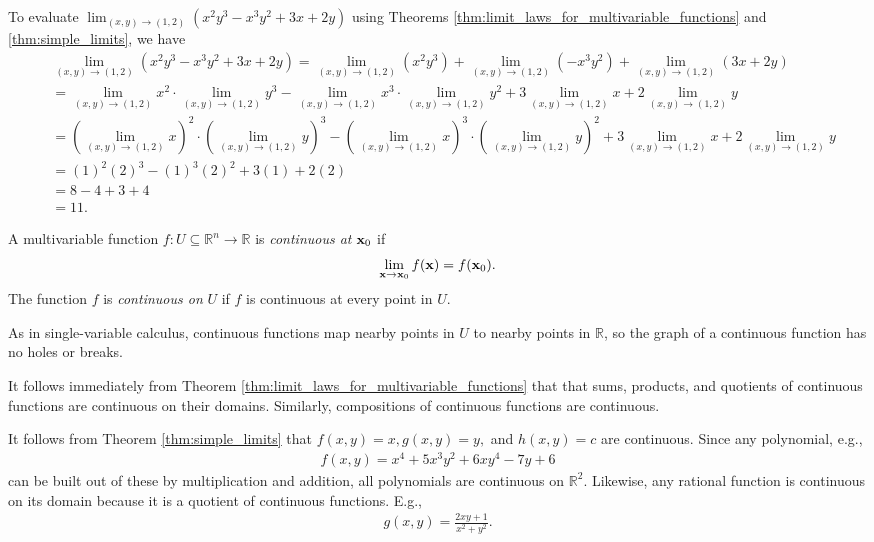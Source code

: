 \documentclass[12pt,letterpaper,reqno]{article}
\numberwithin{equation}{section}
\newcommand{\R}{\ensuremath{\mathbb R}}
\newcommand{\bx}{{\bf x}}
\begin{document}
{\begin{example}
To evaluate $\lim_{(x,y) \to (1,2)}(x^2y^3-x^3y^2+3x+2y)$ using Theorems \ref{thm:limit_laws_for_multivariable_functions} and \ref{thm:simple_limits}, we have
\begin{align*}
	&\lim_{(x,y) \to (1,2)}(x^2y^3-x^3y^2+3x+2y)=\lim_{(x,y) \to (1,2)}(x^2y^3)+\lim_{(x,y) \to (1,2)}(-x^3y^2)+\lim_{(x,y) \to (1,2)}(3x+2y) \\
	&=\lim_{(x,y) \to (1,2)}x^2\cdot \lim_{(x,y) \to (1,2)}y^3 - \lim_{(x,y) \to (1,2)} x^3\cdot \lim_{(x,y) \to (1,2)} y^2+3\lim_{(x,y) \to (1,2)} x+2\lim_{(x,y) \to (1,2)}y \\
	&=(\lim_{(x,y) \to (1,2)}x)^2\cdot (\lim_{(x,y) \to (1,2)}y)^3 - (\lim_{(x,y) \to (1,2)} x)^3\cdot (\lim_{(x,y) \to (1,2)} y)^2+3\lim_{(x,y) \to (1,2)} x+2\lim_{(x,y) \to (1,2)}y \\ 
	&=(1)^2(2)^3-(1)^3(2)^2+3(1)+2(2) \\
	&=8-4+3+4 \\
	&=11.
\end{align*} 	
\end{example}

\begin{defn}
 A multivariable function $f:U \subseteq \R^n \to \R$ is \emph{continuous at} $\bx_0$ if
\begin{align*}
	\lim_{\bx \to \bx_0}f(\bx)=f(\bx_0).
\end{align*}
The function $f$ is \emph{continuous on} $U$ if $f$ is continuous at every point in $U$.	
\end{defn}
As in single-variable calculus, continuous functions map nearby points in $U$ to nearby points in $\mathbb{R}$, so the graph of a continuous function has no holes or breaks.

It follows immediately from Theorem \ref{thm:limit_laws_for_multivariable_functions} that that sums, products, and quotients of continuous functions are continuous on their domains. Similarly, compositions of continuous functions are continuous.  

It follows from Theorem \ref{thm:simple_limits} that $f(x,y)=x, g(x,y)=y,$ and $h(x,y)=c$ are continuous. Since any polynomial, e.g.,
\begin{align*}
	f(x,y)=x^4+5x^3y^2+6xy^4-7y+6
\end{align*}
can be built out of these by multiplication and addition, all polynomials are continuous on $\mathbb{R}^2$. Likewise, any rational function is continuous on its domain because it is a quotient of continuous functions. E.g.,
\begin{align*}
	g(x,y)=\frac{2xy+1}{x^2+y^2}.
\end{align*}

}
\end{document}
